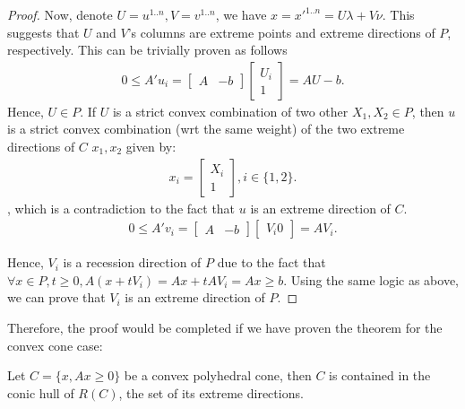 \begin{proof}
Now, denote \( U = u^{1..n}, V = v^{1..n} \), we have \( x = x'^{1..n} =
U\lambda+V\nu \). This suggests that \( U \) and \( V \)'s columns are
extreme points and extreme directions of \( P\), respectively. This can be
trivially proven as follows
\begin{align*}
  0 \le  A'u_{i} = \begin{bmatrix} A & -b \end{bmatrix}  \begin{bmatrix} U_{i}
\\ 1 \end{bmatrix}  = AU - b
.\end{align*}
Hence, \( U \in P \). If \( U \) is a strict convex combination of two other \(
X_{1}, X_{2} \in P\), then \( u \) is a strict convex combination (wrt the same
weight) of the two extreme directions of \( C \) \( x_{1}, x_{2} \) given by:
\begin{align*}
  x_{i} = \begin{bmatrix} X_{i} \\ 1 \end{bmatrix}, i \in \{1, 2\}  
.\end{align*}, which is a contradiction to the fact that \( u \) is an extreme
direction of \( C \).
\begin{align*}
  0 \le  A'v_{i} = \begin{bmatrix} A & -b \end{bmatrix} \begin{bmatrix} V_{i} 0
\end{bmatrix}  = AV_{i}
.\end{align*}

Hence, \( V_{i} \) is a recession direction of \( P \) due to the fact that \(
\forall x \in P, t \ge  0, A(x+tV_{i}) = Ax + tAV_{i} = Ax \ge  b \). Using the
same logic as above, we can prove that \( V_{i} \) is an extreme direction of \(
P\).

\end{proof}

Therefore, the proof would be completed if we have proven the theorem for the
convex cone case:

\begin{theorem}
  Let \( C = \{x, Ax \ge  0\}   \) be a convex polyhedral cone, then \( C \) is
  contained in the conic hull of \( R(C) \), the set of its extreme directions.
\end{theorem}

